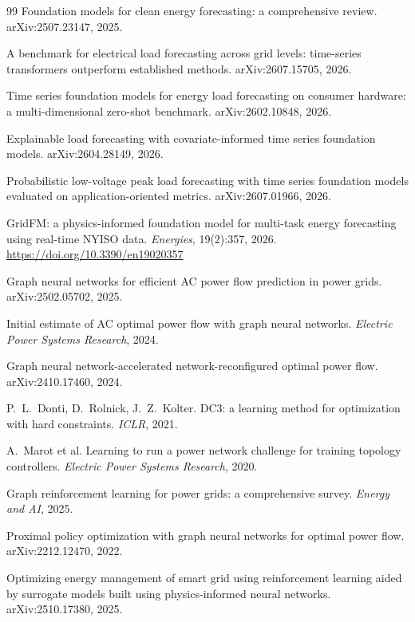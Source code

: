 \documentclass[10pt,a4paper,oneside]{article}
\begin{document}
\begin{thebibliography}{99}
Foundation models for clean energy forecasting: a comprehensive review.
arXiv:2507.23147, 2025.

A benchmark for electrical load forecasting across grid levels: time-series
transformers outperform established methods. arXiv:2607.15705, 2026.

Time series foundation models for energy load forecasting on consumer
hardware: a multi-dimensional zero-shot benchmark. arXiv:2602.10848, 2026.

Explainable load forecasting with covariate-informed time series foundation
models. arXiv:2604.28149, 2026.

Probabilistic low-voltage peak load forecasting with time series foundation
models evaluated on application-oriented metrics. arXiv:2607.01966, 2026.

GridFM: a physics-informed foundation model for multi-task energy forecasting
using real-time NYISO data. \textit{Energies}, 19(2):357, 2026.
\url{https://doi.org/10.3390/en19020357}

Graph neural networks for efficient AC power flow prediction in power grids.
arXiv:2502.05702, 2025.

Initial estimate of AC optimal power flow with graph neural networks.
\textit{Electric Power Systems Research}, 2024.

Graph neural network-accelerated network-reconfigured optimal power flow.
arXiv:2410.17460, 2024.

P.~L.~Donti, D.~Rolnick, J.~Z.~Kolter. DC3: a learning method for optimization
with hard constraints. \textit{ICLR}, 2021.

A.~Marot et al. Learning to run a power network challenge for training
topology controllers. \textit{Electric Power Systems Research}, 2020.

Graph reinforcement learning for power grids: a comprehensive survey.
\textit{Energy and AI}, 2025.

Proximal policy optimization with graph neural networks for optimal power
flow. arXiv:2212.12470, 2022.

Optimizing energy management of smart grid using reinforcement learning aided
by surrogate models built using physics-informed neural networks.
arXiv:2510.17380, 2025.


\end{thebibliography}
\end{document}
